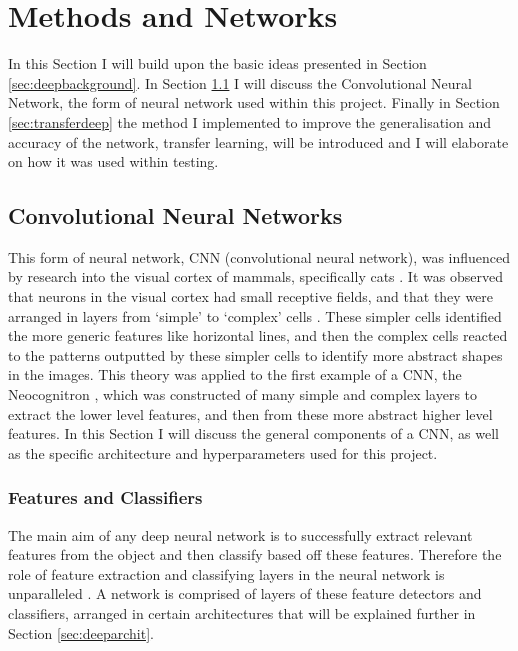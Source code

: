 \documentclass[12pt, onecolumn]{aa}
\begin{document}
\newpage
\section{Methods and Networks} \label{sec:MethodsandNetworks}
In this Section I will build upon the basic ideas presented in Section \ref{sec:deepbackground}. In Section \ref{sec:CNNdeep} I will discuss the Convolutional Neural Network, the form of neural network used within this project. Finally in Section \ref{sec:transferdeep} the method I implemented to improve the generalisation and accuracy of the network, transfer learning, will be introduced and I will elaborate on how it was used within testing.



\subsection{Convolutional Neural Networks} \label{sec:CNNdeep}
This form of neural network, CNN (convolutional neural network), was influenced by research into the visual cortex of mammals, specifically cats \citep{Hubel1959}. It was observed that neurons in the visual cortex had small receptive fields, and that they were arranged in layers from ‘simple’ to ‘complex’ cells \citep{Hubel1968}. These simpler cells identified the more generic features like horizontal lines, and then the complex cells reacted to the patterns outputted by these simpler cells to identify more abstract shapes in the images. This theory was applied to the first example of a CNN, the Neocognitron \citep{Fukushima1980}, which was constructed of many simple and complex layers to extract the lower level features, and then from these more abstract higher level features. In this Section I will discuss the general components of a CNN, as well as the specific architecture and hyperparameters used for this project.

\subsubsection{Features and Classifiers}\label{sec:featandclass}
The main aim of any deep neural network is to successfully extract relevant features from the object and then classify based off these features. Therefore the role of feature extraction and classifying layers in the neural network is unparalleled \citep{pythonmachinelearningbook}. A network is comprised of layers of these feature detectors and classifiers, arranged in certain architectures that will be explained further in Section \ref{sec:deeparchit}. \\
\end{document}
